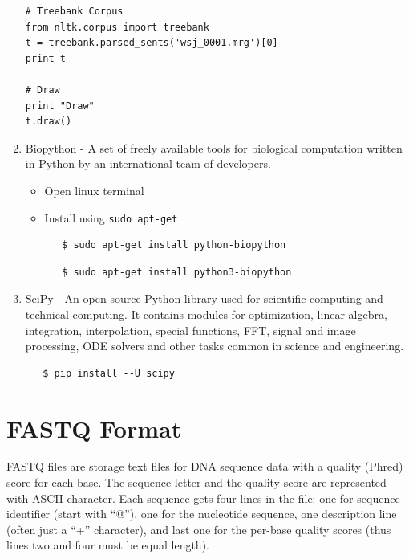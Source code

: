 \documentclass{article}
\begin{document}
\begin{enumerate}
\begin{verbatim}
# Treebank Corpus
from nltk.corpus import treebank
t = treebank.parsed_sents('wsj_0001.mrg')[0]
print t

# Draw
print "Draw"
t.draw()
\end{verbatim}
\normalsize

\item Biopython - A set of freely available tools for biological computation written in Python by an international team of developers.
  \begin{itemize}
   \item Open linux terminal
   \item Install using \verb+sudo apt-get+
   \scriptsize 
  \begin{verbatim}
   $ sudo apt-get install python-biopython
  \end{verbatim}
    \begin{verbatim}
   $ sudo apt-get install python3-biopython
  \end{verbatim}
  \normalsize
\end{itemize}

\item SciPy - An open-source Python library used for scientific computing and technical computing. It contains modules for optimization, linear algebra, integration, interpolation, special functions,
FFT, signal and image processing, ODE solvers and other tasks common in science and engineering.
\scriptsize 
  \begin{verbatim}
   $ pip install --U scipy
  \end{verbatim}
  \normalsize
\end{enumerate}

\section{FASTQ Format}
FASTQ files are storage text files for DNA sequence data with a quality (Phred) score for each base. The sequence letter and the quality score are represented with ASCII character.
Each sequence gets four lines in the file: one for sequence identifier (start with ``@''), one for the nucleotide sequence, one description line (often just a ``+'' character),
and last one for the per-base quality scores (thus lines two and four must be equal length).
\end{document}
